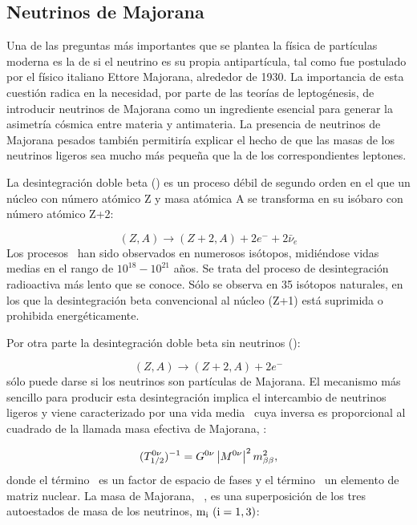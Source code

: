 \subsection*{Neutrinos de Majorana}
Una de las preguntas más importantes que se plantea la física de partículas moderna es la de si el neutrino es su propia antipartícula, tal como fue postulado por el físico italiano Ettore Majorana, alrededor de 1930. La importancia de esta cuestión radica en la necesidad, por parte de las teorías de leptogénesis, de introducir neutrinos de Majorana como un ingrediente esencial para generar la asimetría cósmica entre materia y antimateria. La presencia de neutrinos de Majorana pesados también permitiría explicar el hecho de que las masas de los neutrinos ligeros sea mucho más pequeña que la de los correspondientes leptones. 

La desintegración doble beta (\bb) es un proceso débil de segundo orden en el que un núcleo con número atómico Z y masa atómica A se transforma en su isóbaro con número atómico 
Z+2:

\begin{equation}
(Z,A) \rightarrow (Z+2,A) + 2 e^- + 2 \bar{\nu}_e 
\end{equation}
%                                     
Los procesos \bb\ han sido observados en numerosos isótopos, midiéndose vidas medias en el rango de $10^{18} - 10^{21}$ años. Se trata del proceso de desintegración radioactiva más lento que se conoce. Sólo se observa en 35 isótopos naturales, en los que la desintegración beta convencional al núcleo (Z+1) está suprimida o prohibida energéticamente. 

Por otra parte la desintegración doble beta sin neutrinos (\bbonu):
                                     
\begin{equation}
(Z,A) \rightarrow (Z+2,A) + 2 e^- 
\end{equation}
sólo puede darse si los neutrinos son partículas de Majorana. El mecanismo más sencillo para producir esta desintegración implica el intercambio de neutrinos ligeros y viene caracterizado por una vida media \Tonu\ cuya inversa es proporcional al cuadrado de la llamada masa efectiva de Majorana, \mbb: 
                                    
\begin{equation}
(T_{1/2}^{0\nu})^{-1} =G^{0\nu} \left|M^{0\nu}\right|^2 m_{\beta\beta}^2 ,
\label{eq.t0nu}
\end{equation}
%  
donde el término \Gonu\ es un factor de espacio de fases y el término \Monu\ un elemento de matriz nuclear. La masa  de Majorana, \mbb\ , es una superposición de los tres autoestados de masa de los neutrinos, ${\rm m_i ~(i=1,3)} $: 
                                    
